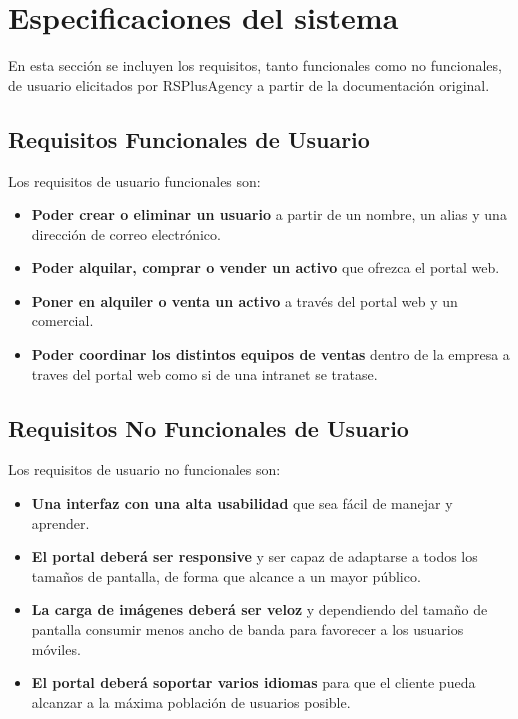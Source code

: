 \section{Especificaciones del sistema}
\par En esta sección se incluyen los requisitos, tanto funcionales como no funcionales, de usuario elicitados por RSPlusAgency a partir de la documentación original.

\subsection{Requisitos Funcionales de Usuario}
\par Los requisitos de usuario funcionales son:
\begin{itemize}
	\item \textbf{Poder crear o eliminar un usuario} a partir de un nombre, un alias y una dirección de correo electrónico.
	\item \textbf{Poder alquilar, comprar o vender un activo} que ofrezca el portal web.
	\item \textbf{Poner en alquiler o venta un activo} a través del portal web y un comercial.
	\item \textbf{Poder coordinar los distintos equipos de ventas} dentro de la empresa a traves del portal web como si de una intranet se tratase. 
\end{itemize}

\subsection{Requisitos No Funcionales de Usuario}
\par Los requisitos de usuario no funcionales son:
\begin{itemize}
	\item \textbf{Una interfaz con una alta usabilidad} que sea fácil de manejar y aprender.
	\item \textbf{El portal deberá ser responsive} y ser capaz de adaptarse a todos los tamaños de pantalla, de forma que alcance a un mayor público.
	\item \textbf{La carga de imágenes deberá ser veloz} y dependiendo del tamaño de pantalla consumir menos ancho de banda para favorecer a los usuarios móviles.
	\item \textbf{El portal deberá soportar varios idiomas} para que el cliente pueda alcanzar a la máxima población de usuarios posible.
\end{itemize}